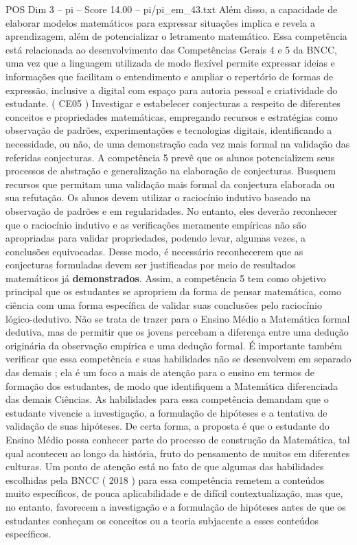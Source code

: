 \begin{textsample}{POS Dim 3 – pi – Score 14.00 – pi/pi\_em\_43.txt}
Além disso, a capacidade de elaborar modelos matemáticos para expressar situações implica e revela a aprendizagem, além de potencializar o letramento matemático.
Essa competência está relacionada ao desenvolvimento das Competências Gerais 4 e 5 da BNCC, uma vez que a linguagem utilizada de modo flexível permite expressar ideias e informações que facilitam o entendimento e ampliar o repertório de formas de expressão, inclusive a digital com espaço para autoria pessoal e criatividade do estudante. ( CE05 ) Investigar e estabelecer conjecturas a respeito de diferentes conceitos e propriedades matemáticas, empregando recursos e estratégias como observação de padrões, experimentações e tecnologias digitais, identificando a necessidade, ou não, de uma demonstração cada vez mais formal na validação das referidas conjecturas.
A competência 5 prevê que os alunos potencializem seus processos de abstração e generalização na elaboração de conjecturas.
Busquem recursos que permitam uma validação mais formal da conjectura elaborada ou sua refutação.
Os alunos devem utilizar o raciocínio indutivo baseado na observação de padrões e em regularidades.
No entanto, eles deverão reconhecer que o raciocínio indutivo e as verificações meramente empíricas não são apropriadas para validar propriedades, podendo levar, algumas vezes, a conclusões equivocadas.
Desse modo, é necessário reconhecerem que as conjecturas formuladas devem ser justificadas por meio de resultados matemáticos já \textbf{demonstrados}.
Assim, a competência 5 tem como objetivo principal que os estudantes se apropriem da forma de pensar matemática, como ciência com uma forma específica de validar suas conclusões pelo raciocínio lógico-dedutivo.
Não se trata de trazer para o Ensino Médio a Matemática formal dedutiva, mas de permitir que os jovens percebam a diferença entre uma dedução originária da observação empírica e uma dedução formal.
É importante também verificar que essa competência e suas habilidades não se desenvolvem em separado das demais ; ela é um foco a mais de atenção para o ensino em termos de formação dos estudantes, de modo que identifiquem a Matemática diferenciada das demais Ciências.
As habilidades para essa competência demandam que o estudante vivencie a investigação, a formulação de hipóteses e a tentativa de validação de suas hipóteses.
De certa forma, a proposta é que o estudante do Ensino Médio possa conhecer parte do processo de construção da Matemática, tal qual aconteceu ao longo da história, fruto do pensamento de muitos em diferentes culturas.
Um ponto de atenção está no fato de que algumas das habilidades escolhidas pela BNCC ( 2018 ) para essa competência remetem a conteúdos muito específicos, de pouca aplicabilidade e de difícil contextualização, mas que, no entanto, favorecem a investigação e a formulação de hipóteses antes de que os estudantes conheçam os conceitos ou a teoria subjacente a esses conteúdos específicos.

\end{textsample}
